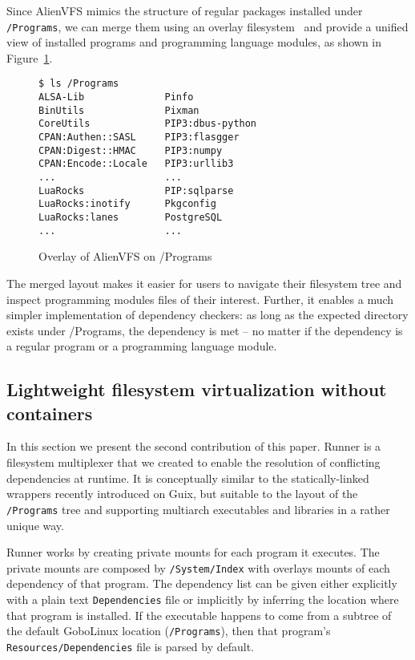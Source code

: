 \documentclass[sigplan, anonymous, 10pt]{acmart}
\begin{document}
Since AlienVFS mimics the structure of regular packages installed under
\texttt{/Programs}, we can merge them using an overlay filesystem~\cite{brown2018:overlayfs}
and provide a unified view of installed programs and programming language modules, as
shown in Figure~\ref{fig:alienvfs.merged}.

\begin{figure}[h]
    \begin{Verbatim}[frame=single]
$ ls /Programs
ALSA-Lib              Pinfo
BinUtils              Pixman
CoreUtils             PIP3:dbus-python
CPAN:Authen::SASL     PIP3:flasgger
CPAN:Digest::HMAC     PIP3:numpy
CPAN:Encode::Locale   PIP3:urllib3
...                   ...
LuaRocks              PIP:sqlparse
LuaRocks:inotify      Pkgconfig
LuaRocks:lanes        PostgreSQL
...                   ...
    \end{Verbatim}
    \caption{Overlay of AlienVFS on /Programs}
    \label{fig:alienvfs.merged}
\end{figure}

The merged layout makes it easier for users to navigate their filesystem tree
and inspect programming modules files of their interest. Further, it enables a
much simpler implementation of dependency checkers: as long as the expected
directory exists under /Programs, the dependency is met -- no matter if the
dependency is a regular program or a programming language module.

\subsection{Lightweight filesystem virtualization without containers}
In this section we present the second contribution of this paper. Runner is a
filesystem multiplexer that we created to enable the resolution of conflicting
dependencies at runtime. It is conceptually similar to the statically-linked
wrappers recently introduced on Guix, but suitable to the layout of the
\texttt{/Programs} tree and supporting multiarch executables and libraries
in a rather unique way.

Runner works by creating private mounts for each program it executes. The
private mounts are composed by \texttt{/System/Index} with overlays mounts
of each dependency of that program. The dependency list can be given either
explicitly with a plain text \texttt{Dependencies} file or implicitly by
inferring the location where that program is installed. If the executable
happens to come from a subtree of  the default GoboLinux location
(\texttt{/Programs}), then that program's \texttt{Resources/Dependencies}
file is parsed by default.
\end{document}
